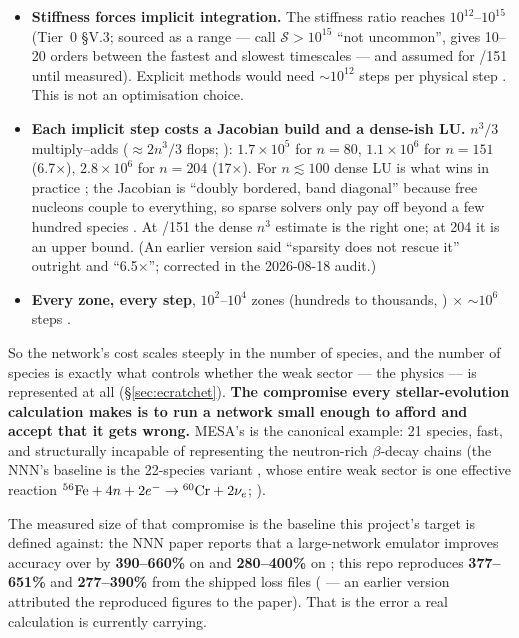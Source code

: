 \begin{itemize}
\item \textbf{Stiffness forces implicit integration.} The stiffness ratio
  reaches $10^{12}$--$10^{15}$ (Tier~0 \S V.3; sourced as a range ---
  \citet{hix1999b} call $\mathcal{S} > 10^{15}$ ``not uncommon'',
  \citet{guidry2012} gives 10--20 orders between the fastest and slowest
  timescales --- and assumed for /151 until measured). Explicit methods
  would need ${\sim}10^{12}$ steps per physical step . This is not an optimisation choice.
\item \textbf{Each implicit step costs a Jacobian build and a dense-ish LU.}
  $n^3/3$ multiply--adds ($\approx 2n^3/3$ flops; \citealt{golub2013}):
  $1.7 \times 10^{5}$ for $n = 80$, $1.1 \times 10^{6}$ for $n = 151$
  (6.7$\times$), $2.8 \times 10^{6}$ for $n = 204$ (17$\times$). For
  $n \lesssim 100$ dense LU is what wins in practice \citep{hix1999b}; the
  Jacobian is ``doubly bordered, band diagonal'' \citep{hix1999b} because free
  nucleons couple to everything, so sparse solvers only pay off beyond a few
  hundred species \citep{timmes1999, paxton2011}. At /151 the dense
  $n^3$ estimate is the right one; at 204 it is an upper bound. (An earlier
  version said ``sparsity does not rescue it'' outright and ``6.5$\times$'';
  corrected in the 2026-08-18 audit.)
\item \textbf{Every zone, every step}, $10^{2}$--$10^{4}$ zones (hundreds to
  thousands, \citealt[\S 6.1]{paxton2011}) $\times$ ${\sim}10^{6}$ steps
  .
\end{itemize}

So the network's cost scales steeply in the number of species, and the number
of species is exactly what controls whether the weak sector --- the \Ye{}
physics --- is represented at all (\S\ref{sec:ecratchet}). \textbf{The
compromise every stellar-evolution calculation makes is to run a network small
enough to afford and accept that it gets \Ye{} wrong.} MESA's  is
the canonical example: 21 species, fast, and structurally incapable of
representing the neutron-rich $\beta$-decay chains (the NNN's baseline is the
22-species variant , whose entire weak sector
is one effective reaction $\nuc{Fe}{56} + 4n + 2e^- \to \nuc{Cr}{60} + 2\nu_e$;
\citealt[\S 3]{grichener2025}).

The measured size of that compromise is the baseline this project's target is
defined against: the NNN paper reports that a large-network emulator improves
\Ye{} accuracy over  by \textbf{390--660\%} on  and
\textbf{280--400\%} on  \citep[\S 3]{grichener2025}; this repo
reproduces \textbf{377--651\%} and \textbf{277--390\%} from the shipped loss
files ( --- an earlier version attributed the reproduced
figures to the paper). That is the error a real calculation is currently
carrying.


